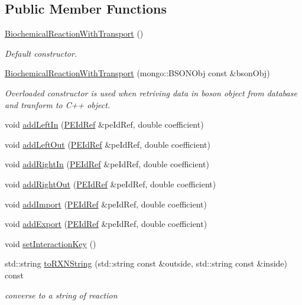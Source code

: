 \subsection*{Public Member Functions}
\begin{DoxyCompactItemize}
\item 
\hyperlink{classunisys_1_1BiochemicalReactionWithTransport_a0123a9057d275ac2a5c1c7ece8760c45}{Biochemical\-Reaction\-With\-Transport} ()
\begin{DoxyCompactList}\small\item\em Default constructor. \end{DoxyCompactList}\item 
\hyperlink{classunisys_1_1BiochemicalReactionWithTransport_ae43f3ef0de1f8adcc07c3a0aae37ce5d}{Biochemical\-Reaction\-With\-Transport} (mongo\-::\-B\-S\-O\-N\-Obj const \&bson\-Obj)
\begin{DoxyCompactList}\small\item\em Overloaded constructor is used when retriving data in boson object from database and tranform to C++ object. \end{DoxyCompactList}\item 
void \hyperlink{classunisys_1_1BiochemicalReactionWithTransport_a1a2cf84dd0f2ff964c30d128672fe6f4}{add\-Left\-In} (\hyperlink{classunisys_1_1PEIdRef}{P\-E\-Id\-Ref} \&pe\-Id\-Ref, double coefficient)
\item 
void \hyperlink{classunisys_1_1BiochemicalReactionWithTransport_ae19e6120575e8cf5bcc79f83024d8f75}{add\-Left\-Out} (\hyperlink{classunisys_1_1PEIdRef}{P\-E\-Id\-Ref} \&pe\-Id\-Ref, double coefficient)
\item 
void \hyperlink{classunisys_1_1BiochemicalReactionWithTransport_a61aeefa2111c40134c9072c96fb84627}{add\-Right\-In} (\hyperlink{classunisys_1_1PEIdRef}{P\-E\-Id\-Ref} \&pe\-Id\-Ref, double coefficient)
\item 
void \hyperlink{classunisys_1_1BiochemicalReactionWithTransport_a3567d77df0d2f9ebc7b5c14bcfcfa2c2}{add\-Right\-Out} (\hyperlink{classunisys_1_1PEIdRef}{P\-E\-Id\-Ref} \&pe\-Id\-Ref, double coefficient)
\item 
void \hyperlink{classunisys_1_1BiochemicalReactionWithTransport_adf0e10be1ddb1bc58591a8e305d4bfd7}{add\-Import} (\hyperlink{classunisys_1_1PEIdRef}{P\-E\-Id\-Ref} \&pe\-Id\-Ref, double coefficient)
\item 
void \hyperlink{classunisys_1_1BiochemicalReactionWithTransport_a95ad769f30ccf98bde213af8e282c979}{add\-Export} (\hyperlink{classunisys_1_1PEIdRef}{P\-E\-Id\-Ref} \&pe\-Id\-Ref, double coefficient)
\item 
void \hyperlink{classunisys_1_1BiochemicalReactionWithTransport_aa47aa306b9157473a48ad8e83a27cda3}{set\-Interaction\-Key} ()
\item 
std\-::string \hyperlink{classunisys_1_1BiochemicalReactionWithTransport_af0a913d23fbc37e845840570249b46f4}{to\-R\-X\-N\-String} (std\-::string const \&outside, std\-::string const \&inside) const 
\begin{DoxyCompactList}\small\item\em converse to a string of reaction \end{DoxyCompactList}\end{DoxyCompactItemize}

